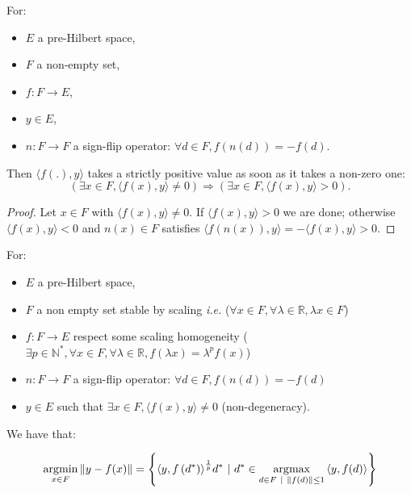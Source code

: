\begin{lemma}\label{lemma:sign_symmetrization}

For:

\begin{itemize}
\item
  \(E\) a pre-Hilbert space,
\item
  \(F\) a non-empty set,
\item
  \(f:F \rightarrow E\),
\item
  \(y \in E\),
\item
  \(n:F \rightarrow F\) a sign-flip operator:
  \(\forall d \in F,f\left( n(d) \right) = - f(d)\).
\end{itemize}

Then \(\langle f\left( . \right),y\rangle\) takes a strictly positive
value as soon as it takes a non-zero one:
\[\left( \exists x \in F,{\langle f(x),y\rangle} \neq 0 \right) \Longrightarrow \left( \exists x \in F,{\langle f(x),y\rangle} > 0 \right).\]

\end{lemma}

\begin{proof}

Let \(x \in F\) with \({\langle f(x),y\rangle} \neq 0\). If
\({\langle f(x),y\rangle} > 0\) we are done; otherwise
\({\langle f(x),y\rangle} < 0\) and \(n(x) \in F\) satisfies
\({\langle f\left( n(x) \right),y\rangle} = - {\langle f(x),y\rangle} > 0\).

\end{proof}

\begin{theorem}\label{lemma:argmin_norm_to_argmax_scalarp}

For:

\begin{itemize}
\item
  \(E\) a pre-Hilbert space,
\item
  \(F\) a non empty set stable by scaling \emph{i.e.}
  (\(\forall x \in F,\forall\lambda \in \mathbb{R},\lambda x \in F\))
\item
  \(f:F \rightarrow E\) respect some scaling homogeneity
  (\(\exists p \in \mathbb{N}^{\ast},\forall x \in F,\forall\lambda \in \mathbb{R},f(\lambda x) = \lambda^{p}f(x)\))
\item
  \(n:F \rightarrow F\) a sign-flip operator:
  \(\forall d \in F,f\left( n(d) \right) = - f(d)\)
\item
  \(y \in E\) such that
  \(\exists x \in F,{\langle f(x),y\rangle} \neq 0\) (non-degeneracy).
\end{itemize}

We have that:

\begin{equation}\label{eq:fixed_norm_optimization_equivalence}
\operatorname*{\arg\!\min}_{x \in F}\left\| {y - f(x)} \right\| = \left\{ {\langle y,f\left( d^{\ast} \right)\rangle}^{\frac{1}{p}}d^{\ast}~|~d^{\ast} \in \operatorname*{\arg\!\max}_{d \in F~|~\left\| {f(d)} \right\| \leq 1}{\langle y,f(d)\rangle} \right\}
\end{equation}

\end{theorem}

